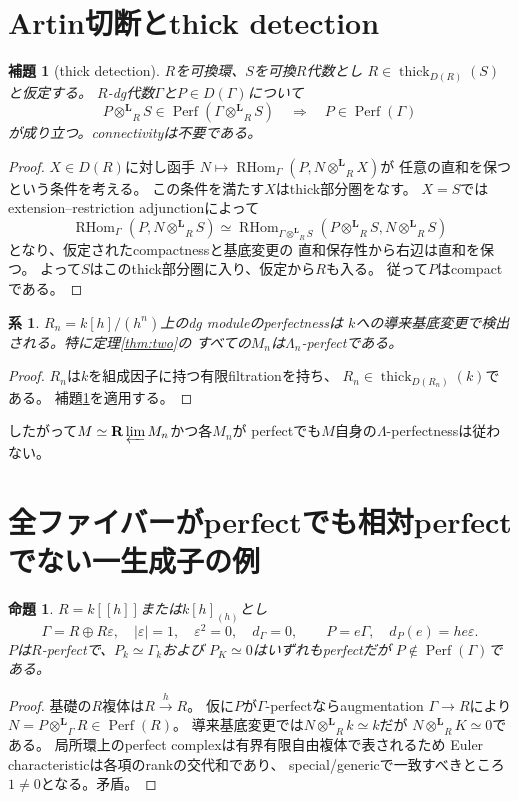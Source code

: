 \documentclass[a4paper,11pt]{ltjsarticle}
\newtheorem{lemma}[theorem]{補題}
\newtheorem{proposition}[theorem]{命題}
\newtheorem{corollary}[theorem]{系}
\newcommand{\Perf}{\operatorname{Perf}}
\newcommand{\RHom}{\operatorname{RHom}}
\newcommand{\thick}{\operatorname{thick}}
\newcommand{\otL}{\mathbin{\otimes^{\mathbf L}}}
\begin{document}
\section{Artin切断とthick detection}
\begin{lemma}[thick detection]\label{lem:thick}
$R$を可換環、$S$を可換$R$代数とし
$R\in\thick_{D(R)}(S)$と仮定する。
$R$-dg代数$\Gamma$と$P\in D(\Gamma)$について
\[
P\otL_RS\in\Perf(\Gamma\otL_RS)
\quad\Longrightarrow\quad P\in\Perf(\Gamma)
\]
が成り立つ。connectivityは不要である。
\end{lemma}
\begin{proof}
$X\in D(R)$に対し函手
$N\mapsto\RHom_\Gamma(P,N\otL_RX)$が
任意の直和を保つという条件を考える。
この条件を満たす$X$はthick部分圏をなす。
$X=S$ではextension--restriction adjunctionによって
\[
\RHom_\Gamma(P,N\otL_RS)
\simeq \RHom_{\Gamma\otL_RS}
(P\otL_RS,N\otL_RS)
\]
となり、仮定されたcompactnessと基底変更の
直和保存性から右辺は直和を保つ。
よって$S$はこのthick部分圏に入り、仮定から$R$も入る。
従って$P$はcompactである。
\end{proof}
\begin{corollary}\label{cor:artin}
$R_n=k[h]/(h^n)$上のdg moduleのperfectnessは
$k$への導来基底変更で検出される。特に定理\ref{thm:two}の
すべての$M_n$は$\Lambda_n$-perfectである。
\end{corollary}
\begin{proof}
$R_n$は$k$を組成因子に持つ有限filtrationを持ち、
$R_n\in\thick_{D(R_n)}(k)$である。
補題\ref{lem:thick}を適用する。
\end{proof}
したがって$M\simeq\mathbf R\varprojlim M_n$かつ各$M_n$が
perfectでも$M$自身の$\Lambda$-perfectnessは従わない。

\section{全ファイバーがperfectでも相対perfectでない一生成子の例}
\begin{proposition}
$R=k[[h]]$または$k[h]_{(h)}$とし
\[
\Gamma=R\oplus R\varepsilon,\quad
|\varepsilon|=1,\quad\varepsilon^2=0,\quad d_\Gamma=0,
\qquad P=e\Gamma,\quad d_P(e)=he\varepsilon.
\]
$P$は$R$-perfectで、$P_k\simeq\Gamma_k$および
$P_K\simeq0$はいずれもperfectだが
$P\notin\Perf(\Gamma)$である。
\end{proposition}
\begin{proof}
基礎の$R$複体は$R\xrightarrow{h}R$。
仮に$P$が$\Gamma$-perfectならaugmentation
$\Gamma\to R$により$N=P\otL_\Gamma R\in\Perf(R)$。
導来基底変更では$N\otL_Rk\simeq k$だが
$N\otL_RK\simeq0$である。
局所環上のperfect complexは有界有限自由複体で表されるため
Euler characteristicは各項のrankの交代和であり、
special/genericで一致すべきところ$1\ne0$となる。矛盾。
\end{proof}
\end{document}
